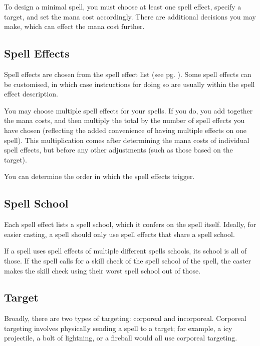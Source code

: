 To design a minimal spell, you must choose at least one spell effect, specify
a target, and set the mana cost accordingly. There are additional decisions
you may make, which can effect the mana cost further.

\subsection{Spell Effects}
Spell effects are chosen from the spell effect list (see pg.
\pageref{spell-effect-list}). Some spell effects can be customised, in which
case instructions for doing so are usually within the spell effect description.

You may choose multiple spell effects for your spells. If you do, you add
together the mana costs, and then multiply the total by the number of spell
effects you have chosen (reflecting the added convenience of having multiple
effects on one spell). This multiplication comes after determining the mana
costs of individual spell effects, but before any other adjustments (such as
those based on the target).

You can determine the order in which the spell effects trigger.

\subsection{Spell School}
Each spell effect lists a spell school, which it confers on the spell itself.
Ideally, for easier casting, a spell should only use spell effects that share
a spell school.

If a spell uses spell effects of multiple different spells schools, its school
is all of those. If the spell calls for a skill check of the spell school of
the spell, the caster makes the skill check using their worst spell school out
of those.

\subsection{Target}
Broadly, there are two types of targeting: corporeal and incorporeal. Corporeal
targeting involves physically sending a spell to a target; for example, a icy
projectile, a bolt of lightning, or a fireball would all use corporeal
targeting.

